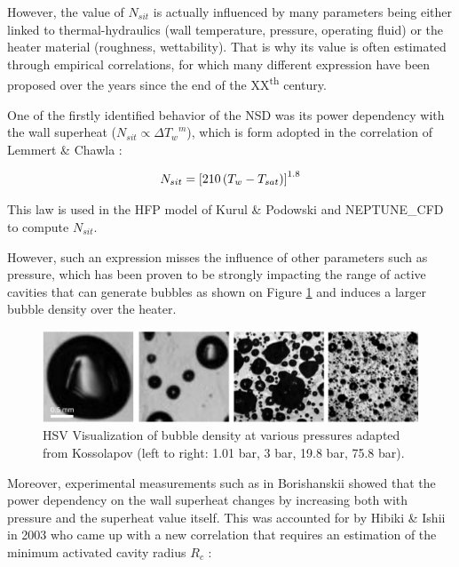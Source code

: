 However, the value of $N_{sit}$ is actually influenced by many parameters being either linked to thermal-hydraulics (wall temperature, pressure, operating fluid) or the heater material (roughness, wettability). That is why its value is often estimated through empirical correlations, for which many different expression have been proposed over the years since the end of the XX\textsuperscript{th} century.

\npar

One of the firstly identified behavior of the NSD was its power dependency with the wall superheat ($N_{sit} \propto {\Delta T_{w}}^{m}$), which is form adopted in the correlation of Lemmert \& Chawla \cite{Lemmert} : 

\begin{align}
N_{sit}=\left[ 210\left( T_{w}-T_{sat} \right) \right]^{1.8}
\label{eq:nsit_lemmert}
\end{align}

\begin{remark*}{}
This law is used in the HFP model of Kurul \& Podowski and NEPTUNE\_CFD to compute $N_{sit}$.
\end{remark*}

However, such an expression misses the influence of other parameters such as pressure, which has been proven to be strongly impacting the range of active cavities that can generate bubbles as shown on Figure \ref{fig:nsd_P_koss} and induces a larger bubble density over the heater. 

\begin{figure}[h!]
\centering
\includegraphics[width=0.7\linewidth]{img/NSD/nsd_press_koss.png}
\caption{HSV Visualization of bubble density at various pressures adapted from Kossolapov \cite{kossolapov_experimental_2021} (left to right: 1.01 bar, 3 bar, 19.8 bar, 75.8 bar). }
\label{fig:nsd_P_koss}
\end{figure}

\npar

Moreover, experimental measurements such as in Borishanskii \cite{borishanskii} showed that the power dependency on the wall superheat changes by increasing both with pressure and the superheat value itself. This was accounted for by Hibiki \& Ishii in 2003 \cite{hibiki_ishii} who came up with a new correlation that requires an estimation of the minimum activated cavity radius $R_{c}$ : 


